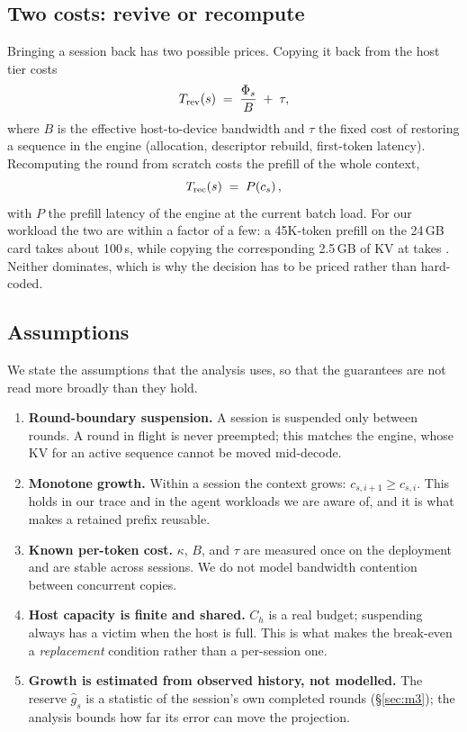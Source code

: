 \subsection{Two costs: revive or recompute}

Bringing a session back has two possible prices. Copying it back from the host tier costs
\begin{equation}
T_{\mathrm{rev}}(s)\;=\;\frac{\Phi_s}{B}\;+\;\tau ,
\label{eq:trev}
\end{equation}
where $B$ is the effective host-to-device bandwidth and $\tau$ the fixed cost of
restoring a sequence in the engine (allocation, descriptor rebuild, first-token
latency). Recomputing the round from scratch costs the prefill of the whole context,
\begin{equation}
T_{\mathrm{rec}}(s)\;=\;P\!\left(c_{s}\right),
\label{eq:trec}
\end{equation}
with $P$ the prefill latency of the engine at the current batch load. For our workload
the two are within a factor of a few: a 45K-token prefill on the 24\,GB card takes
about 100\,s, while copying the corresponding 2.5\,GB of KV at 
takes . Neither dominates, which is why the decision has to be priced
rather than hard-coded.

\subsection{Assumptions}

We state the assumptions that the analysis uses, so that the guarantees are not read more
broadly than they hold.
\begin{enumerate}
\item \textbf{Round-boundary suspension.} A session is suspended only between rounds. A
round in flight is never preempted; this matches the engine, whose KV for an active
sequence cannot be moved mid-decode.
\item \textbf{Monotone growth.} Within a session the context grows: $c_{s,i+1}\ge c_{s,i}$.
This holds in our trace and in the agent workloads we are aware of, and it is what makes
a retained prefix reusable.
\item \textbf{Known per-token cost.} $\kappa$, $B$, and $\tau$ are measured once on the
deployment and are stable across sessions. We do not model bandwidth contention between
concurrent copies.
\item \textbf{Host capacity is finite and shared.} $C_h$ is a real budget; suspending
always has a victim when the host is full. This is what makes the break-even a
\emph{replacement} condition rather than a per-session one.
\item \textbf{Growth is estimated from observed history, not modelled.} The reserve
$\hat g_s$ is a statistic of the session's own completed rounds (\S\ref{sec:m3}); the
analysis bounds how far its error can move the projection.
\end{enumerate}
